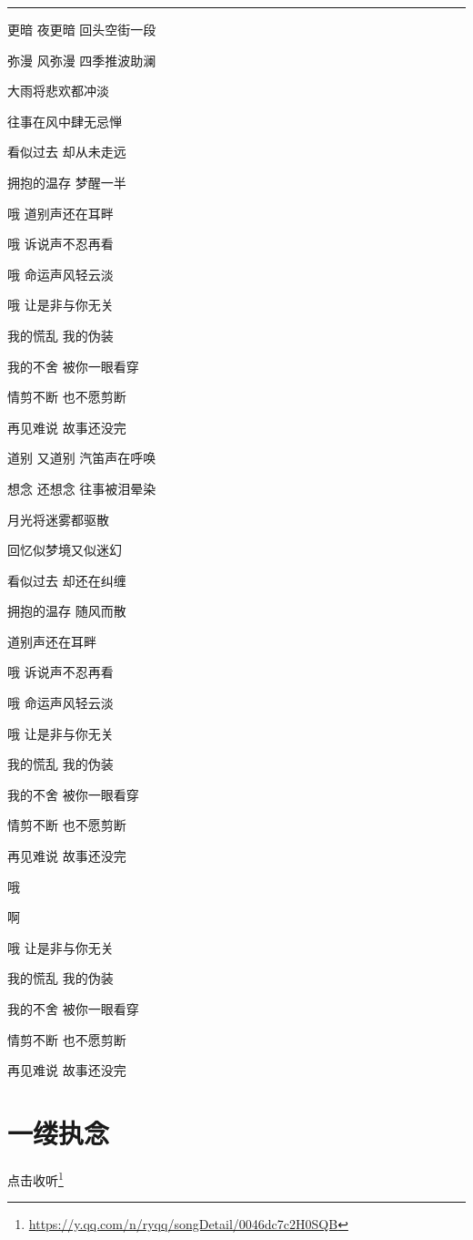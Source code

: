 \documentclass[]{ctexbook}
\renewcommand{\href}[2]{#2\footnote{\url{#1}}}
\begin{document}
\begin{center}\rule{0.5\linewidth}{0.5pt}\end{center}

更暗 夜更暗 回头空街一段

弥漫 风弥漫 四季推波助澜

大雨将悲欢都冲淡

往事在风中肆无忌惮

看似过去 却从未走远

拥抱的温存 梦醒一半

哦 道别声还在耳畔

哦 诉说声不忍再看

哦 命运声风轻云淡

哦 让是非与你无关

我的慌乱 我的伪装

我的不舍 被你一眼看穿

情剪不断 也不愿剪断

再见难说 故事还没完

道别 又道别 汽笛声在呼唤

想念 还想念 往事被泪晕染

月光将迷雾都驱散

回忆似梦境又似迷幻

看似过去 却还在纠缠

拥抱的温存 随风而散

道别声还在耳畔

哦 诉说声不忍再看

哦 命运声风轻云淡

哦 让是非与你无关

我的慌乱 我的伪装

我的不舍 被你一眼看穿

情剪不断 也不愿剪断

再见难说 故事还没完

哦

啊

哦 让是非与你无关

我的慌乱 我的伪装

我的不舍 被你一眼看穿

情剪不断 也不愿剪断

再见难说 故事还没完

\section*{一缕执念}\label{a-wisp-of-obsession}


\href{https://y.qq.com/n/ryqq/songDetail/0046dc7c2H0SQB}{点击收听}
\end{document}
